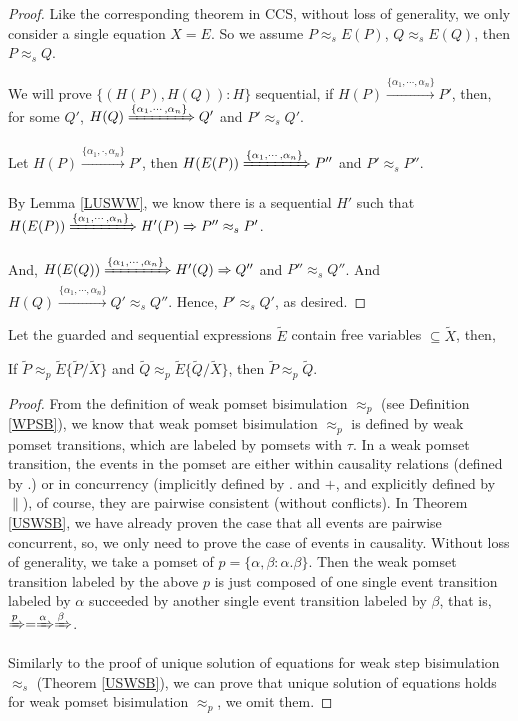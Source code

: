 \begin{proof}
Like the corresponding theorem in CCS, without loss of generality, we only consider a single equation $X=E$. So we assume $P\approx_s E(P)$, $Q\approx_s E(Q)$, then $P\approx_s Q$.

We will prove $\{(H(P),H(Q)): H\}$ sequential, if $H(P)\xrightarrow{\{\alpha_1,\cdots,\alpha_n\}}P'$, then, for some $Q'$, $H(Q)\xRightarrow{\{\alpha_1.\cdots,\alpha_n\}}Q'$ and $P'\approx_s Q'$.

Let $H(P)\xrightarrow{\{\alpha_1,\cdot,\alpha_n\}}P'$, then $H(E(P))\xRightarrow{\{\alpha_1,\cdots,\alpha_n\}}P''$ and $P'\approx_s P''$.

By Lemma \ref{LUSWW}, we know there is a sequential $H'$ such that $H(E(P))\xRightarrow{\{\alpha_1,\cdots,\alpha_n\}}H'(P)\Rightarrow P''\approx_s P'$.

And, $H(E(Q))\xRightarrow{\{\alpha_1,\cdots,\alpha_n\}}H'(Q)\Rightarrow Q''$ and $P''\approx_s Q''$. And $H(Q)\xrightarrow{\{\alpha_1,\cdots,\alpha_n\}}Q'\approx_s Q''$. Hence, $P'\approx_s Q'$, as desired.
\end{proof}

\begin{theorem}\label{USWPB}
Let the guarded and sequential expressions $\widetilde{E}$ contain free variables $\subseteq \widetilde{X}$, then,

If $\widetilde{P}\approx_p \widetilde{E}\{\widetilde{P}/\widetilde{X}\}$ and $\widetilde{Q}\approx_p \widetilde{E}\{\widetilde{Q}/\widetilde{X}\}$, then $\widetilde{P}\approx_p \widetilde{Q}$.
\end{theorem}

\begin{proof}
From the definition of weak pomset bisimulation $\approx_{p}$ (see Definition \ref{WPSB}), we know that weak pomset bisimulation $\approx_{p}$ is defined by weak pomset transitions, which are labeled by pomsets with $\tau$. In a weak pomset transition, the events in the pomset are either within causality relations (defined by $.$) or in concurrency (implicitly defined by $.$ and $+$, and explicitly defined by $\parallel$), of course, they are pairwise consistent (without conflicts). In Theorem \ref{USWSB}, we have already proven the case that all events are pairwise concurrent, so, we only need to prove the case of events in causality. Without loss of generality, we take a pomset of $p=\{\alpha,\beta:\alpha.\beta\}$. Then the weak pomset transition labeled by the above $p$ is just composed of one single event transition labeled by $\alpha$ succeeded by another single event transition labeled by $\beta$, that is, $\xRightarrow{p}=\xRightarrow{\alpha}\xRightarrow{\beta}$.

Similarly to the proof of unique solution of equations for weak step bisimulation $\approx_{s}$ (Theorem \ref{USWSB}), we can prove that unique solution of equations holds for weak pomset bisimulation $\approx_{p}$, we omit them.
\end{proof}

